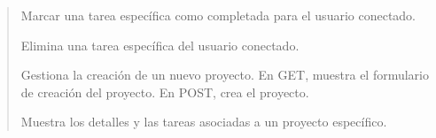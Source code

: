 \documentclass[letterpaper,10pt,spanish]{sphinxmanual}
\begin{document}
\begin{quote}
\begin{description}
\begin{description}
\sphinxAtStartPar
Marcar una tarea específica como completada para el usuario conectado.

\sphinxAtStartPar
Elimina una tarea específica del usuario conectado.

\sphinxAtStartPar
Gestiona la creación de un nuevo proyecto. En GET, muestra el formulario de creación del proyecto. En POST, crea el proyecto.

\sphinxAtStartPar
Muestra los detalles y las tareas asociadas a un proyecto específico.

\end{description}

\end{description}
\end{quote}

\begin{fulllineitems}
\label{\detokenize{myapp:myapp.views.about}}
\pysigstartsignatures
\pysiglinewithargsret
{}
{}
{}
\pysigstopsignatures
\end{fulllineitems}


\begin{fulllineitems}
\label{\detokenize{myapp:myapp.views.cerrar_sesion}}
\pysigstartsignatures
\pysiglinewithargsret
{}
{}
{}
\pysigstopsignatures
\end{fulllineitems}


\begin{fulllineitems}
\label{\detokenize{myapp:myapp.views.complete_task}}
\pysigstartsignatures
\pysiglinewithargsret
{}
{\sphinxparamcomma {}}
{}
\pysigstopsignatures
\end{fulllineitems}
\end{document}

